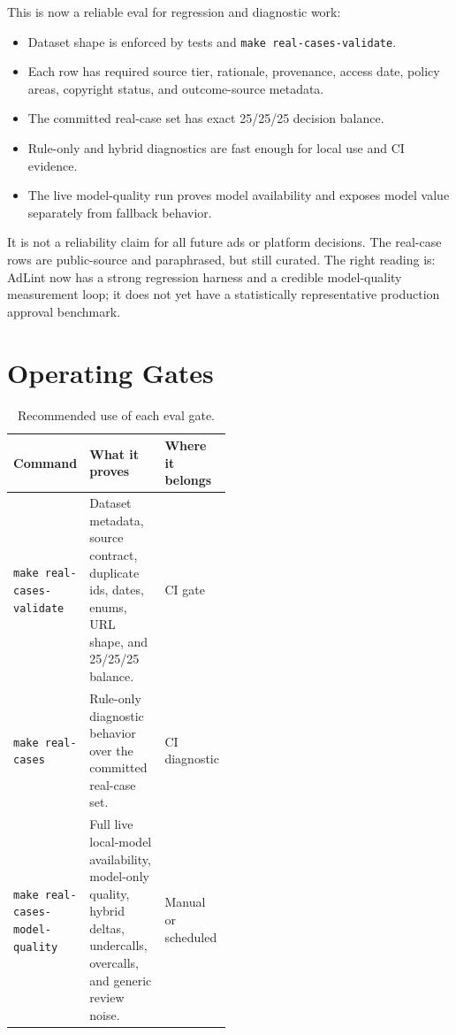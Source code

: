 \documentclass[10pt]{article}
\begin{document}
This is now a reliable eval for regression and diagnostic work:

\begin{itemize}
  \item Dataset shape is enforced by tests and \texttt{make real-cases-validate}.
  \item Each row has required source tier, rationale, provenance, access date,
  policy areas, copyright status, and outcome-source metadata.
  \item The committed real-case set has exact 25/25/25 decision balance.
  \item Rule-only and hybrid diagnostics are fast enough for local use and CI
  evidence.
  \item The live model-quality run proves model availability and exposes model
  value separately from fallback behavior.
\end{itemize}

It is not a reliability claim for all future ads or platform decisions. The
real-case rows are public-source and paraphrased, but still curated. The right
reading is: AdLint now has a strong regression harness and a credible
model-quality measurement loop; it does not yet have a statistically
representative production approval benchmark.

\section{Operating Gates}

\begin{table}[!htbp]
\centering
\caption{Recommended use of each eval gate.}
\label{tab:gates}
\small
\begin{tabularx}{\linewidth}{@{}P{0.29\linewidth}L P{0.20\linewidth}@{}}
\toprule
\textbf{Command} & \textbf{What it proves} & \textbf{Where it belongs} \\
\midrule
\texttt{make real-cases-validate} & Dataset metadata, source contract, duplicate ids, dates, enums, URL shape, and 25/25/25 balance. & CI gate \\
\texttt{make real-cases} & Rule-only diagnostic behavior over the committed real-case set. & CI diagnostic \\
\texttt{make real-cases-model-quality} & Full live local-model availability, model-only quality, hybrid deltas, undercalls, overcalls, and generic review noise. & Manual or scheduled \\
\bottomrule
\end{tabularx}
\end{table}
\end{document}
